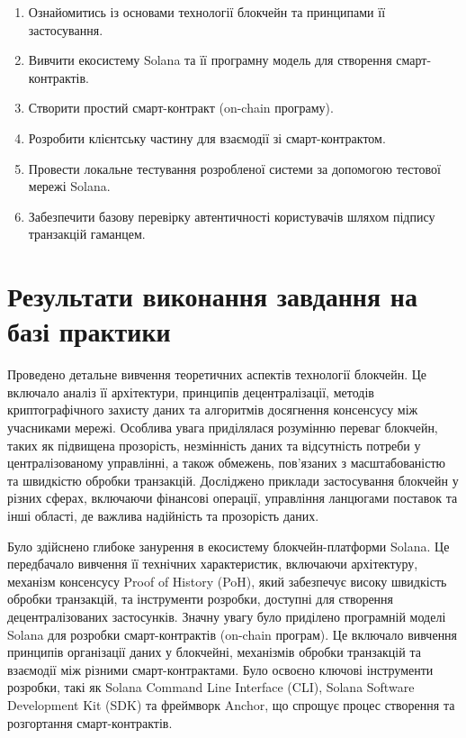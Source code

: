 \documentclass[14pt]{extreport}
\begin{document}
\begin{enumerate}
	\item Ознайомитись із основами технології блокчейн та принципами її застосування.
	\item Вивчити екосистему Solana та її програмну модель для створення смарт-контрактів.
	\item Створити простий смарт-контракт (on-chain програму).
	\item Розробити клієнтську частину для взаємодії зі смарт-контрактом.
	\item Провести локальне тестування розробленої системи за допомогою тестової мережі Solana.
	\item Забезпечити базову перевірку автентичності користувачів шляхом підпису транзакцій гаманцем.
\end{enumerate}

\section{Результати виконання завдання на базі практики}

Проведено детальне вивчення теоретичних аспектів технології блокчейн. Це включало аналіз її архітектури, принципів децентралізації, методів криптографічного захисту даних та алгоритмів досягнення консенсусу між учасниками мережі. Особлива увага приділялася розумінню переваг блокчейн, таких як підвищена прозорість, незмінність даних та відсутність потреби у централізованому управлінні, а також обмежень, пов'язаних з масштабованістю та швидкістю обробки транзакцій. Досліджено приклади застосування блокчейн у різних сферах, включаючи фінансові операції, управління ланцюгами поставок та інші області, де важлива надійність та прозорість даних.

Було здійснено глибоке занурення в екосистему блокчейн-платформи Solana. Це передбачало вивчення її технічних характеристик, включаючи архітектуру, механізм консенсусу Proof of History (PoH), який забезпечує високу швидкість обробки транзакцій, та інструменти розробки, доступні для створення децентралізованих застосунків. Значну увагу було приділено програмній моделі Solana для розробки смарт-контрактів (on-chain програм). Це включало вивчення принципів організації даних у блокчейні, механізмів обробки транзакцій та взаємодії між різними смарт-контрактами. Було освоєно ключові інструменти розробки, такі як Solana Command Line Interface (CLI), Solana Software Development Kit (SDK) та фреймворк Anchor, що спрощує процес створення та розгортання смарт-контрактів.
\end{document}
